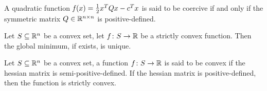 \begin{prop}
A quadratic function $\operatorname*{\mathit{f}}(x)=\frac{1}{2}x^TQx-c^Tx$ is said to be coercive if and only if the symmetric matrix $Q\in\mathbb{R}^{n\times n}$ is positive-defined.
\end{prop}

\begin{prop}
Let $S\subseteq\mathbb{R}^n$ be a convex set, let $f\colon S\to\mathbb{R}$ be a strictly convex function. Then the global minimum, if exists, is unique.
\end{prop}

\begin{defs}
Let $S\subseteq\mathbb{R}^n$ be a convex set, a function $f\colon S\to\mathbb{R}$ is said to be convex if the hessian matrix is semi-positive-defined. If the hessian matrix is positive-defined, then the function is strictly convex.
\end{defs}









